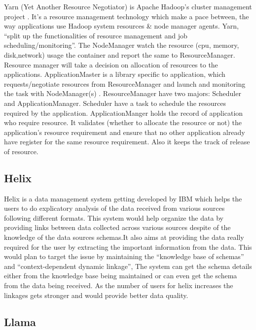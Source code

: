      Yarn (Yet Another Resource Negotiator) is Apache Hadoop’s cluster
     management project \cite{www-cloudera} . It’s a resource
     management technology which make a pace between, the way
     applications use Hadoop system resources \& node manager
     agents. Yarn, ``split up the functionalities of resource
     management and job scheduling/monitoring''. The NodeManager watch
     the resource (cpu, memory, disk,network) usage the container and
     report the same to ResourceManager. Resource manager will take a
     decision on allocation of resources to the
     applications. ApplicationMaster is a library specific to
     application, which requests/negotiate resources from
     ResourceManager and launch and monitoring the task with
     NodeManager(s) \cite{www-architecture}.  ResourceManager have
     two majors: Scheduler and ApplicationManager. Scheduler have a
     task to schedule the resources required by the
     application. ApplicationManger holds the record of application
     who require resource. It validates (whether to allocate the
     resource or not) the application’s resource requirement and
     ensure that no other application already have register for the
     same resource requirement. Also it keeps the track of release of
     resource. \cite{www-HadoopApache}

\subsection{Helix \cv}

     Helix is a data management system getting developed by IBM which
     helps the users to do explicatory analysis of the data received
     from various sources following different formats. This system
     would help organize the data by providing links between data
     collected across various sources despite of the knowledge of the
     data sources schemas.It also aims at providing  the data really
     required for the user by extracting the important information
     from the data. This would plan to target the issue by
     maintaining the ``knowledge base of schemas'' and
     ``context-dependent dynamic linkage'', The system can get the
     schema details either from the  knowledge base being maintained
     or can even get the schema from the data being received. As the
     number of users for helix increases the linkages gets stronger
     and would provide better data
     quality. \cite{www-ibm-helix-paper}
      
\subsection{Llama}


